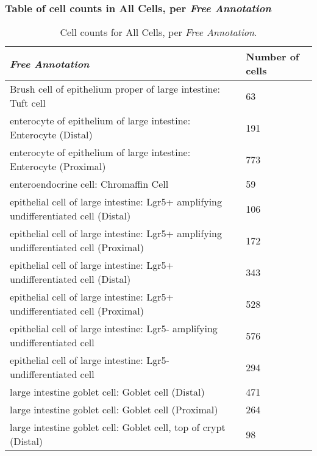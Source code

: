 \subsubsection{Table of cell counts in All Cells, per \emph{Free Annotation}}\begin{table}[h]
\centering
\label{my-label}
\begin{tabular}{@{}ll@{}}
\toprule

\emph{Free Annotation}& Number of cells \\ \midrule
Brush cell of epithelium proper of large intestine: Tuft cell & 63 \\

enterocyte of epithelium of large intestine: Enterocyte (Distal) & 191 \\

enterocyte of epithelium of large intestine: Enterocyte (Proximal) & 773 \\

enteroendocrine cell: Chromaffin Cell & 59 \\

epithelial cell of large intestine: Lgr5+ amplifying undifferentiated cell (Distal) & 106 \\

epithelial cell of large intestine: Lgr5+ amplifying undifferentiated cell (Proximal) & 172 \\

epithelial cell of large intestine: Lgr5+ undifferentiated cell (Distal) & 343 \\

epithelial cell of large intestine: Lgr5+ undifferentiated cell (Proximal) & 528 \\

epithelial cell of large intestine: Lgr5- amplifying undifferentiated cell & 576 \\

epithelial cell of large intestine: Lgr5- undifferentiated cell & 294 \\

large intestine goblet cell: Goblet cell (Distal) & 471 \\

large intestine goblet cell: Goblet cell (Proximal) & 264 \\

large intestine goblet cell: Goblet cell, top of crypt (Distal) & 98 \\
\bottomrule
\end{tabular}
\caption{Cell counts for All Cells, per \emph{Free Annotation}.}
\end{table}

